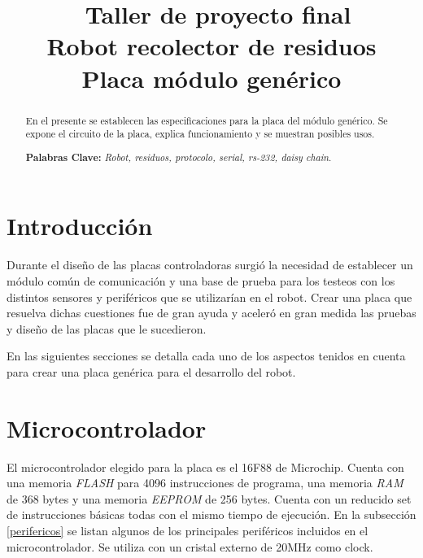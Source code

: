 \documentclass[a4paper,10pt]{article}
\begin{document}
\title{{\ Taller de proyecto final \\ Robot recolector de residuos \\ Placa m\'odulo gen\'erico}}



\maketitle

\begin{abstract}
En el presente se establecen las especificaciones para la placa del m\'odulo gen\'erico.
Se expone el circuito de la placa, explica funcionamiento y se muestran posibles usos.

\textbf{Palabras Clave: }\emph{Robot, residuos, protocolo, serial, rs-232, daisy chain}.
\end{abstract}



\section{Introducci\'on}
\label{introduccion}

Durante el dise\~no de las placas controladoras surgi\'o la necesidad de establecer un m\'odulo com\'un de comunicaci\'on y una base de prueba
para los testeos con los distintos sensores y perif\'ericos que se utilizar\'ian en el robot.
Crear una placa que resuelva dichas cuestiones fue de gran ayuda y aceler\'o en gran medida las pruebas y dise\~no de las placas que le sucedieron.

En las siguientes secciones se detalla cada uno de los aspectos tenidos en cuenta para crear una placa gen\'erica para el desarrollo del robot.

\section{Microcontrolador}
\label{microcontrolado}

El microcontrolador elegido para la placa es el 16F88 de Microchip.
Cuenta con una memoria \emph{FLASH} para 4096 instrucciones de programa, una memoria \emph{RAM} de 368 bytes y una memoria \emph{EEPROM} de 256 bytes.
Cuenta con un reducido set de instrucciones b\'asicas todas con el mismo tiempo de ejecuci\'on.
En la subsecci\'on \ref{perifericos} se listan algunos de los principales perif\'ericos incluidos en el microcontrolador.
Se utiliza con un cristal externo de 20MHz como clock.
\end{document}
